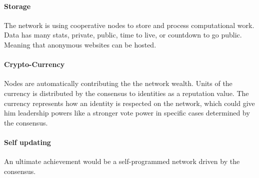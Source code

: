 \paragraph{Storage}
The network is using cooperative nodes to store and process computational work. Data has many stats, private, public, time to live, or countdown to go public. Meaning that anonymous websites can be hosted.

\paragraph{Crypto-Currency}
Nodes are automatically contributing the the network wealth. Units of the currency is distributed by the consensus to identities as a reputation value. The currency represents how an identity is respected on the network, which could give him leadership powers like a stronger vote power in specific cases determined by the consensus.

\paragraph{Self updating}
An ultimate achievement would be a self-programmed network driven by the consensus.\cite{Gabel2008DynamicallyDevelopers}

